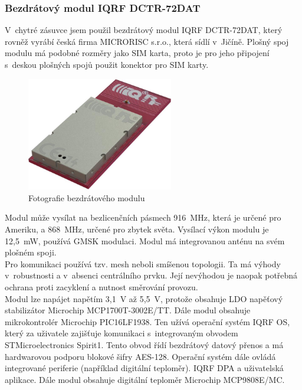\documentclass[12pt,a4paper,oneside]{article}
\begin{document}
\newpage

\subsubsection{Bezdrátový modul IQRF DCTR-72DAT}

V~chytré zásuvce jsem použil bezdrátový modul IQRF DCTR-72DAT, který rovněž vyrábí česká firma MICRORISC s.r.o., která sídlí v~Jičíně. Plošný spoj modulu má podobné rozměry jako SIM karta, proto je pro jeho připojení s~deskou plošných spojů použit konektor pro SIM karty. \\ 

\begin{figure}[H]
\centering
\label{fig:iqrf/fotka}
\includegraphics[width = 64mm]{img/iqrf/dctr-72dat.png}
\caption{Fotografie bezdrátového modulu}
\end{figure}

Modul může vysílat na bezlicenčních pásmech 916~MHz, která je určené pro Ameriku, a 868~MHz, určené pro zbytek světa. Vysílací výkon modulu je 12,5~mW, používá GMSK modulaci. Modul má integrovanou anténu na svém plošném spoji. \\

Pro komunikaci používá tzv. mesh neboli smíšenou topologii. Ta má výhody v~robustnosti a v~absenci centrálního prvku. Její nevýhodou je naopak potřebná ochrana proti zacyklení a nutnost směrování provozu. \\

Modul lze napájet napětím 3,1~V až 5,5~V, protože obsahuje LDO napěťový stabilizátor Microchip MCP1700T-3002E/TT. Dále modul obsahuje mikrokontrolér Microchip PIC16LF1938. Ten užívá operační systém IQRF OS, který za uživatele zajišťuje komunikaci s~integrovaným obvodem STMicroelectronics Spirit1. Tento obvod řídí bezdrátový datový přenos a má hardwarovou podporu blokové šifry AES-128. Operační systém dále ovládá integrované periferie (například digitální teploměr). IQRF DPA a uživatelská aplikace. Dále modul obsahuje digitální teploměr Microchip MCP9808E/MC. \\ 
\end{document}
